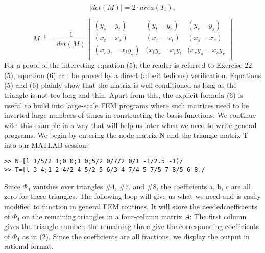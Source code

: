 \documentclass[../main.tex]{subfiles}
\begin{document}
\begin{equation}\label{eqa5}
	|det(M)|=2 \cdot area(T_t),
\end{equation}

\begin{equation}\label{eqa6}
	M^{-1}=\dfrac{1}{det(M)}
	\begin{bmatrix} 
		  (y_s-y_t) & (y_t-y_r) & (y_r-y_s)\\
		  (x_t-x_s) & (x_r-x_t) & (x_s-x_r)\\
		  (x_s y_t -x_t y_s) & (x_t y_r -x_t y_t & (x_r y_s -x_s y_r\\	 
	\end{bmatrix}
\end{equation}
For a proof of the interesting equation (5), the reader is referred to Exercise 22. 
 (5), equation (6) can be proved by a direct (albeit tedious) verification. Equations (5) and (6) plainly show that the matrix is well conditioned as long as the triangle is not too long and thin. Apart from this, the explicit formula (6) is useful to build into large-scale FEM programs where such matrices need to be inverted large numbers of times in constructing the basis functions. We continue with this example in a way that will help us later when we need to write general programs. We begin by entering the node matrix N and the triangle matrix T into our MATLAB session: 

\begin{lstlisting}[numbers=none,frame=none]
>> N=[l 1/5/2 1;0 0;1 0;5/2 0/7/2 0/1 -1/2.5 -1)/ 
>> T=[l 3 4;1 2 4/2 4 5/2 5 6/3 4 7/4 5 7/5 7 8/5 6 8]/
\end{lstlisting}

Since $\Phi_4$ vanishes over triangles $\#4$, $\#7$, and $\#8$, the coefficients a, b, c are all zero for these triangles. The following loop will give us what we need and is easily modified to function in general FEM routines. It will store the neededcoefficients of $\Phi_4$ on the remaining triangles in a four-column matrix $A$: The first column gives the triangle number; the remaining three give the corresponding coefficients of $\Phi_4$ as in (2). Since the coefficients are all fractions, we display the output in rational format. 
\end{document}
